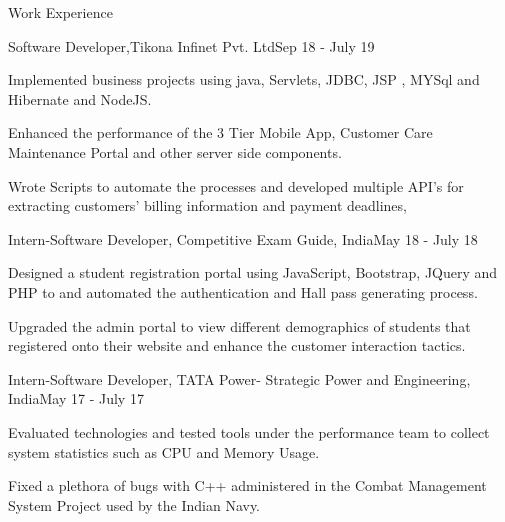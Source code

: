 \documentclass{resume} %
\begin{document}
\vspace{-1mm}
\begin{rSection}{Work Experience}

\begin{rSubsection}{Software Developer,Tikona Infinet Pvt. Ltd}{Sep 18 - July 19}{}

    \item Implemented business projects using java, Servlets, JDBC, JSP , MYSql and Hibernate and NodeJS.
\item Enhanced the performance of the 3 Tier Mobile App, Customer Care Maintenance Portal and other server side components.
\item Wrote Scripts to automate the processes and developed multiple API's for extracting customers' billing information and payment deadlines,

\end{rSubsection}


\begin{rSubsection}{Intern-Software Developer, Competitive Exam Guide, India}{May 18 - July 18}{}{}
\item Designed a student registration portal using JavaScript, Bootstrap, JQuery and PHP to and automated the authentication and Hall pass generating process.
\item Upgraded the admin portal to view different demographics of students that registered onto their website  and enhance the customer interaction tactics. 
\end{rSubsection}

\begin{rSubsection}{Intern-Software Developer, TATA Power- Strategic Power and Engineering, India}{May 17 - July 17}{}{}
\item Evaluated technologies and tested tools under the performance team to collect system statistics such as CPU and Memory Usage.
\item Fixed a plethora of bugs with C++ administered in the Combat Management System Project used by the Indian Navy.

\end{rSubsection}




\end{rSection}
\end{document}
